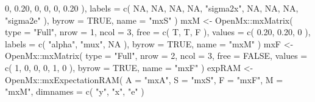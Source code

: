 \documentclass[
]{book}
\newenvironment{Shaded}{\begin{snugshade}}{\end{snugshade}}
\newcommand{\AttributeTok}[1]{\textcolor[rgb]{0.77,0.63,0.00}{#1}}
\newcommand{\ConstantTok}[1]{\textcolor[rgb]{0.00,0.00,0.00}{#1}}
\newcommand{\DecValTok}[1]{\textcolor[rgb]{0.00,0.00,0.81}{#1}}
\newcommand{\FloatTok}[1]{\textcolor[rgb]{0.00,0.00,0.81}{#1}}
\newcommand{\FunctionTok}[1]{\textcolor[rgb]{0.00,0.00,0.00}{#1}}
\newcommand{\NormalTok}[1]{#1}
\newcommand{\OtherTok}[1]{\textcolor[rgb]{0.56,0.35,0.01}{#1}}
\newcommand{\SpecialCharTok}[1]{\textcolor[rgb]{0.00,0.00,0.00}{#1}}
\newcommand{\StringTok}[1]{\textcolor[rgb]{0.31,0.60,0.02}{#1}}
\theoremstyle{definition}
\theoremstyle{definition}
\theoremstyle{definition}
\theoremstyle{remark}
\begin{document}
\begin{Shaded}
\begin{Highlighting}[]
    \DecValTok{0}\NormalTok{, }\FloatTok{0.20}\NormalTok{, }\DecValTok{0}\NormalTok{,}
    \DecValTok{0}\NormalTok{, }\DecValTok{0}\NormalTok{, }\FloatTok{0.20}
\NormalTok{  ),}
  \AttributeTok{labels =} \FunctionTok{c}\NormalTok{(}
    \ConstantTok{NA}\NormalTok{, }\ConstantTok{NA}\NormalTok{, }\ConstantTok{NA}\NormalTok{,}
    \ConstantTok{NA}\NormalTok{, }\StringTok{"sigma2x"}\NormalTok{, }\ConstantTok{NA}\NormalTok{,}
    \ConstantTok{NA}\NormalTok{, }\ConstantTok{NA}\NormalTok{, }\StringTok{"sigma2e"}
\NormalTok{  ),}
  \AttributeTok{byrow =} \ConstantTok{TRUE}\NormalTok{,}
  \AttributeTok{name =} \StringTok{"mxS"}
\NormalTok{)}
\NormalTok{mxM }\OtherTok{\textless{}{-}}\NormalTok{ OpenMx}\SpecialCharTok{::}\FunctionTok{mxMatrix}\NormalTok{(}
  \AttributeTok{type =} \StringTok{"Full"}\NormalTok{,}
  \AttributeTok{nrow =} \DecValTok{1}\NormalTok{,}
  \AttributeTok{ncol =} \DecValTok{3}\NormalTok{,}
  \AttributeTok{free =} \FunctionTok{c}\NormalTok{(}
\NormalTok{    T, T, F}
\NormalTok{  ),}
  \AttributeTok{values =} \FunctionTok{c}\NormalTok{(}
    \FloatTok{0.20}\NormalTok{,}
    \FloatTok{0.20}\NormalTok{,}
    \DecValTok{0}
\NormalTok{  ),}
  \AttributeTok{labels =} \FunctionTok{c}\NormalTok{(}
    \StringTok{"alpha"}\NormalTok{,}
    \StringTok{"mux"}\NormalTok{,}
    \ConstantTok{NA}
\NormalTok{  ),}
  \AttributeTok{byrow =} \ConstantTok{TRUE}\NormalTok{,}
  \AttributeTok{name =} \StringTok{"mxM"}
\NormalTok{)}
\NormalTok{mxF }\OtherTok{\textless{}{-}}\NormalTok{ OpenMx}\SpecialCharTok{::}\FunctionTok{mxMatrix}\NormalTok{(}
  \AttributeTok{type =} \StringTok{"Full"}\NormalTok{,}
  \AttributeTok{nrow =} \DecValTok{2}\NormalTok{,}
  \AttributeTok{ncol =} \DecValTok{3}\NormalTok{,}
  \AttributeTok{free =} \ConstantTok{FALSE}\NormalTok{,}
  \AttributeTok{values =} \FunctionTok{c}\NormalTok{(}
    \DecValTok{1}\NormalTok{, }\DecValTok{0}\NormalTok{, }\DecValTok{0}\NormalTok{,}
    \DecValTok{0}\NormalTok{, }\DecValTok{1}\NormalTok{, }\DecValTok{0}
\NormalTok{  ),}
  \AttributeTok{byrow =} \ConstantTok{TRUE}\NormalTok{,}
  \AttributeTok{name =} \StringTok{"mxF"}
\NormalTok{)}
\NormalTok{expRAM }\OtherTok{\textless{}{-}}\NormalTok{ OpenMx}\SpecialCharTok{::}\FunctionTok{mxExpectationRAM}\NormalTok{(}
  \AttributeTok{A =} \StringTok{"mxA"}\NormalTok{,}
  \AttributeTok{S =} \StringTok{"mxS"}\NormalTok{,}
  \AttributeTok{F =} \StringTok{"mxF"}\NormalTok{,}
  \AttributeTok{M =} \StringTok{"mxM"}\NormalTok{,}
  \AttributeTok{dimnames =} \FunctionTok{c}\NormalTok{(}
    \StringTok{"y"}\NormalTok{,}
    \StringTok{"x"}\NormalTok{,}
    \StringTok{"e"}
\NormalTok{  )}

\end{Highlighting}
\end{Shaded}
\end{document}
